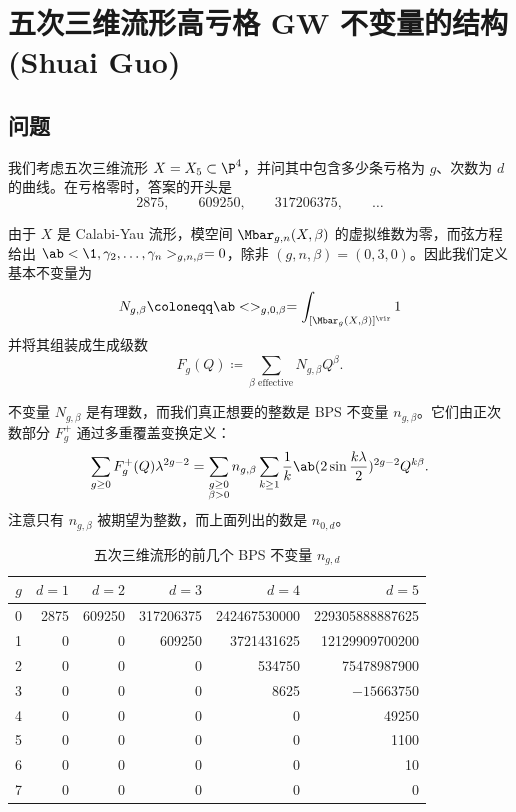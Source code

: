 \section{五次三维流形高亏格 GW 不变量的结构 (Shuai Guo)}%
\label{sec:Structure of higher-genus GW invariants of the quintic (Shuai Guo)}

\subsection{问题}%
\label{sub:The problem (Guo)}

我们考虑五次三维流形 \(X = X_5 \subset \P^4\)，并问其中包含多少条亏格为 \(g\)、次数为 \(d\) 的曲线。在亏格零时，答案的开头是
\[ 2875, \qquad 609250, \qquad 317206375, \qquad \ldots \]

由于 \(X\) 是 Calabi-Yau 流形，模空间 \(\Mbar_{g,n}(X,\beta)\) 的虚拟维数为零，而弦方程给出 \(\ab<\1, \gamma_2, \ldots, \gamma_n>_{g,n,\beta} = 0\)，除非 \((g,n,\beta) = (0,3,0)\)。因此我们定义基本不变量为
\[ N_{g,\beta} \coloneqq \ab<>_{g,0,\beta} = \int_{[\Mbar_g(X,\beta)]^{\vir}} 1 \]
并将其组装成生成级数
\[ F_g(Q) \coloneqq \sum_{\beta \text{ effective}} N_{g,\beta}Q^{\beta}. \]

不变量 \(N_{g,\beta}\) 是有理数，而我们真正想要的整数是 BPS 不变量 \(n_{g,\beta}\)。它们由正次数部分 \(F_g^+\) 通过多重覆盖变换定义：
\[ \sum_{g \geq 0} F_g^+(Q)\lambda^{2g-2} = \sum_{\substack{g \geq 0 \\ \beta > 0}} n_{g,\beta} \sum_{k \geq 1} \frac{1}{k} \ab(2 \sin \frac{k\lambda}{2})^{2g-2}Q^{k\beta}. \]
注意只有 \(n_{g,\beta}\) 被期望为整数，而上面列出的数是 \(n_{0,d}\)。

\begin{table}[htpb]
    \centering
    \caption{五次三维流形的前几个 BPS 不变量 \(n_{g,d}\)}
    \label{tab:quinticbps}
    \begin{tabular}{crrrrr}
        \toprule
        \(g\) & \(d=1\) & \(d=2\) & \(d=3\) & \(d=4\) & \(d=5\) \\
        \midrule
        0 & 2875 & 609250 & 317206375 & 242467530000 & 229305888887625 \\
        1 & 0 & 0 & 609250 & 3721431625 & 12129909700200 \\
        2 & 0 & 0 & 0 & 534750 & 75478987900 \\
        3 & 0 & 0 & 0 & 8625 & \(-15663750\) \\
        4 & 0 & 0 & 0 & 0 & 49250 \\
        5 & 0 & 0 & 0 & 0 & 1100 \\
        6 & 0 & 0 & 0 & 0 & 10 \\
        7 & 0 & 0 & 0 & 0 & 0 \\
        \bottomrule
    \end{tabular}
\end{table}

